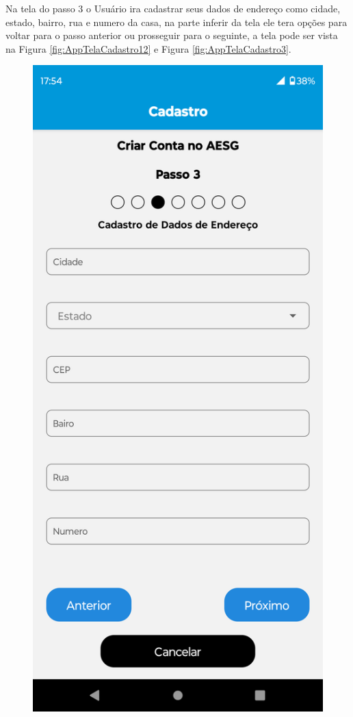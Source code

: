 \documentclass[
    12pt,                   %
    openright,              %
    oneside,                %
    a4paper,                %
    sumario=tradicional,    %
    english,                %
    brazil,                 %
    ]{abntex2}
\begin{document}
            \newpage
            Na tela do passo 3 o Usuário ira cadastrar seus dados de endereço como cidade, estado, bairro, rua e numero  da casa, na parte inferir da tela ele tera opções para voltar para o passo anterior ou prosseguir para o seguinte, a tela pode ser vista na Figura \ref{fig:AppTelaCadastro12} e Figura \ref{fig:AppTelaCadastro3}.
            \begin{figure}[!h]          
                \begin{minipage}{0.5\textwidth}
                    \centering
                    \includegraphics[width=0.8\linewidth]{Imagens/App Images User/AUCadastro12.png}

\end{minipage}
\end{figure}
\end{document}
